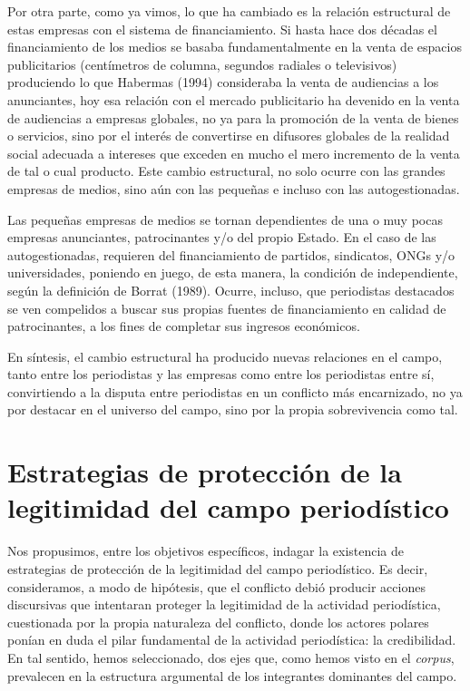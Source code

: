 Por otra parte, como ya vimos, lo que ha cambiado es la relación estructural de estas empresas con el sistema de financiamiento. Si hasta hace dos décadas el financiamiento de los medios se basaba fundamentalmente en la venta de espacios publicitarios (centímetros de columna, segundos radiales o televisivos) produciendo lo que Habermas (1994) consideraba la venta de audiencias a los anunciantes, hoy esa relación con el mercado publicitario ha devenido en la venta de audiencias a empresas globales, no ya para la promoción de la venta de bienes o servicios, sino por el interés de convertirse en difusores globales de la realidad social adecuada a intereses que exceden en mucho el mero incremento de la venta de tal o cual producto. Este cambio estructural, no solo ocurre con las grandes empresas de medios, sino aún con las pequeñas e incluso con las autogestionadas.

Las pequeñas empresas de medios se tornan dependientes de una o muy pocas empresas anunciantes, patrocinantes y/o del propio Estado. En el caso de las autogestionadas, requieren del financiamiento de partidos, sindicatos, ONGs y/o universidades, poniendo en juego, de esta manera, la condición de independiente, según la definición de Borrat (1989). Ocurre, incluso, que periodistas destacados se ven compelidos a buscar sus propias fuentes de financiamiento en calidad de patrocinantes, a los fines de completar sus ingresos económicos.

En síntesis, el cambio estructural ha producido nuevas relaciones en el campo, tanto entre los periodistas y las empresas como entre los periodistas entre sí, convirtiendo a la disputa entre periodistas en un conflicto más encarnizado, no ya por destacar en el universo del campo, sino por la propia sobrevivencia como tal.

\section{Estrategias de protección de la legitimidad del campo periodístico}

Nos propusimos, entre los objetivos específicos, indagar la existencia de estrategias de protección de la legitimidad del campo periodístico. Es decir, consideramos, a modo de hipótesis, que el conflicto debió producir acciones discursivas que intentaran proteger la legitimidad de la actividad periodística, cuestionada por la propia naturaleza del conflicto, donde los actores polares ponían en duda el pilar fundamental de la actividad periodística: la credibilidad. En tal sentido, hemos seleccionado, dos ejes que, como hemos visto en el \emph{corpus}, prevalecen en la estructura argumental de los integrantes dominantes del campo.

